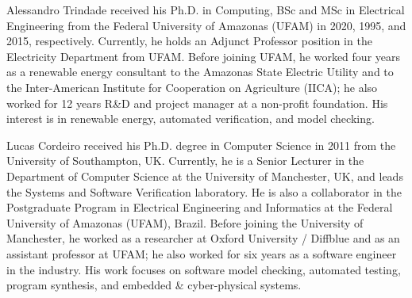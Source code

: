 \documentclass[10pt,journal,compsoc]{IEEEtran}
\begin{document}
\begin{IEEEbiography}
    {Alessandro Trindade}
received his Ph.D. in Computing, BSc and MSc in Electrical Engineering from the Federal University of Amazonas (UFAM) in 2020, 1995, and 2015, respectively. Currently, he holds an Adjunct Professor position in the Electricity Department from UFAM. Before joining UFAM, he worked four years as a renewable energy consultant to the Amazonas State Electric Utility and to the Inter-American Institute for Cooperation on Agriculture (IICA); he also worked for 12 years R\&D and project manager at a non-profit foundation. His interest is in renewable energy, automated verification, and model checking.
\end{IEEEbiography}

\begin{IEEEbiography}
    {Lucas Cordeiro}
received his Ph.D. degree in Computer Science in 2011 from the University of Southampton, UK. Currently, he is a Senior Lecturer in the Department of Computer Science at the University of Manchester, UK, and leads the Systems and Software Verification laboratory. He is also a collaborator in the Postgraduate Program in Electrical Engineering and Informatics at the Federal University of Amazonas (UFAM), Brazil. Before joining the University of Manchester, he worked as a researcher at Oxford University / Diffblue and as an assistant professor at UFAM; he also worked for six years as a software engineer in the industry. His work focuses on software model checking, automated testing, program synthesis, and embedded \& cyber-physical systems.
\end{IEEEbiography}
\end{document}
